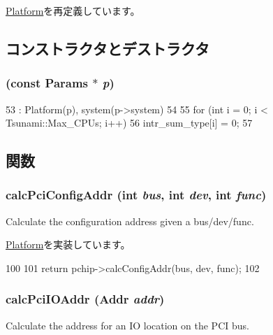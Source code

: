 \hyperlink{classPlatform_af4e77eaf2602e4808deef7d1ba95e579}{Platform}を再定義しています。

\subsection{コンストラクタとデストラクタ}
\hypertarget{classTsunami_a5243b59f52948d92f6ae8f98d0ff43a5}{
\subsubsection[{Tsunami}]{ (const {\bf Params} $\ast$ {\em p})}}
\label{classTsunami_a5243b59f52948d92f6ae8f98d0ff43a5}



\begin{DoxyCode}
53     : Platform(p), system(p->system)
54 {
55     for (int i = 0; i < Tsunami::Max_CPUs; i++)
56         intr_sum_type[i] = 0;
57 }
\end{DoxyCode}


\subsection{関数}
\hypertarget{classTsunami_a5b8797a83289cb5fd895c9a5dc7eae6f}{
\subsubsection[{calcPciConfigAddr}]{ calcPciConfigAddr (int {\em bus}, \/  int {\em dev}, \/  int {\em func})}}
\label{classTsunami_a5b8797a83289cb5fd895c9a5dc7eae6f}
Calculate the configuration address given a bus/dev/func. 

\hyperlink{classPlatform_a4a2bdce1a8794dd3ea6ca12b36320433}{Platform}を実装しています。


\begin{DoxyCode}
100 {
101    return pchip->calcConfigAddr(bus, dev, func);
102 }
\end{DoxyCode}
\hypertarget{classTsunami_a83afd16479598cfaeb035fd30eeedd8b}{
\subsubsection[{calcPciIOAddr}]{ calcPciIOAddr ({\bf Addr} {\em addr})}}
\label{classTsunami_a83afd16479598cfaeb035fd30eeedd8b}
Calculate the address for an IO location on the PCI bus. 

